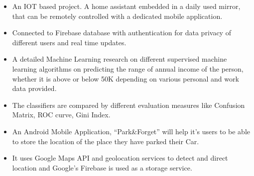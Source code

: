 \documentclass[10pt,a4paper]{altacv}
\begin{document}

\begin{itemize}
\item  An IOT based project. A home assistant embedded in a daily used mirror, that can be remotely controlled with a dedicated mobile application.
\item Connected to Firebase database with authentication for data privacy of different users and real time updates.
\end{itemize}

\divider

\begin{itemize}
\item A detailed Machine Learning research on different supervised machine learning algorithms on predicting the range of annual income of the person, whether it is above or below 50K depending on various personal and work data provided.
\item The classifiers are compared by different evaluation measures like Confusion Matrix, ROC curve, Gini Index.
\end{itemize}
\medskip

\divider


\begin{itemize}
\item  An Android Mobile Application, “Park\&Forget” will help it’s users to be able to store the location of the place they have parked their Car.
\item It uses Google Maps API and geolocation services to detect and direct location and Google's Firebase is used as a storage service.
\end{itemize}
\medskip




\end{document}
